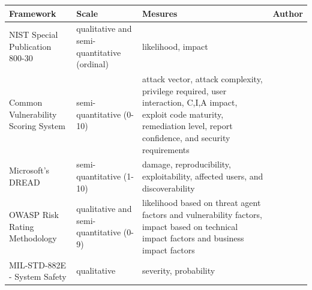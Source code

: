 \documentclass{article}
\begin{document}
\newpage
\begin{landscape}
\begin{longtable}{p{5cm} | p{4cm} | p{8cm} | p{5cm}}
Framework & Scale & Mesures & Author \\ \hline
NIST Special Publication 800-30 & qualitative and semi-quantitative (ordinal) & likelihood, impact                                                                                                                                                                                                                                                                                                                                                                                                                                                             & \cite{national_institute_of_standards_and_technology_nist_2012} \\
Common Vulnerability Scoring System & semi-quantitative (0-10) & attack vector, attack complexity, privilege required, user interaction, C,I,A impact, exploit code maturity, remediation level, report confidence, and security requirements                                                                                                                                                                                                                                                        & \cite{first.org_inc._common_2015} \\
Microsoft's DREAD & semi-quantitative (1-10) & damage, reproducibility, exploitability, affected users, and discoverability                                                                                                                                                                                                                                                                                                                                                                                   & \cite{leblanc_dreadful_2007} \\
OWASP Risk Rating Methodology & qualitative and semi-quantitative (0-9) & likelihood based on threat agent factors and vulnerability factors,  impact based on technical impact factors and business impact factors & \cite{open_web_application_security_project_owasp_2016} \\
MIL-STD-882E - System Safety & qualitative & severity, probability                                                                                                                                                                                                                                                                                                                                                                                                                                                          & \cite{department_of_defense_mil-std-882e_2012} \\

\end{longtable}
\end{landscape}
\end{document}
